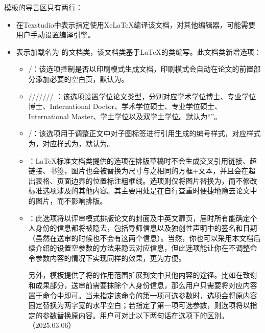 \documentclass[print, doctor, vlined]{DissertUESTC}
\begin{document}
	模板的导言区只有两行：
	\begin{itemize}
		\item {}在Texstudio中表示指定使用XeLaTeX编译该文档，对其他编辑器，可能需要用户手动设置编译引擎。

		\item {}表示加载名为 的文档类，该文档类基于LaTeX的类编写。此文档类新增\textbf{}选项：

		\begin{itemize}
			\item {}/：该选项控制是否以印刷模式生成文档，印刷模式会自动在论文的前置部分添加必要的空白页，默认为。

			\item {}/////// ：该选项设置学位论文类型，分别对应学术学位博士、专业学位博士、International Doctor、学术学位硕士、专业学位硕士、International Master、学士学位以及双学士学位。默认为“”。
   
			\item {}/：该选项用于调整正文中对子图标签进行引用生成的编号样式，对应样式为，对应样式为，默认为。
   
			\item {}：LaTeX标准文档类提供的选项在排版草稿时不会生成交叉引用链接、超链接、书签，图片也会被替换为尺寸与之相同的方框+文本，并且会在超出表格、页面边界的位置标注粗框线。选项则仅将图片替换为，而不修改标准选项涉及的其他内容。其主要用处是在自行查重时便捷地隐去论文中的图片，而不影响排版。
			
			\item {}：此选项将以评审模式排版论文的封面及中英文扉页，届时所有能确定个人身份的信息都将被隐去，包括导师信息以及独创性声明中的签名和日期（虽然在送审的时候也不会有这两个信息）。当然，你也可以采用本文档后续介绍的设置空参数的方法来隐去对应信息，但此选项能让你在不调整命令参数内容的情况下实现同样的效果，更为方便。
			
			另外，模板提供了将的作用范围扩展到文中其他内容的途径。比如在致谢和成果部分，送审前需要抹除个人身份信息，那么用户只需要将对应内容置于命令中即可。当未指定该命令的第一项可选参数时，选项会将原内容固定替换为两字宽的水平空白；若指定了第一项可选参数，则选项将以指定的参数替换原内容。用户可对比以下两句话在选项下的区别。（2025.03.06）


\end{itemize}
\end{itemize}
\end{document}
